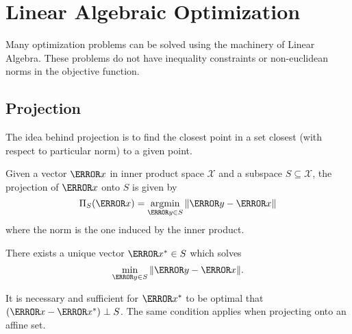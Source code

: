 \section{Linear Algebraic Optimization}
Many optimization problems can be solved using the machinery of Linear Algebra.
These problems do not have inequality constraints or non-euclidean norms in the objective function.
\subsection{Projection}
The idea behind projection is to find the closest point in a set closest (with respect to particular norm) to a given point.
\begin{definition}
  Given a vector $\V{x}$ in inner product space $\mathcal{X}$ and a subspace $S\subseteq\mathcal{X}$, the projection of $\V{x}$ onto $S$ is given by
  \[
	\Pi_S(\V{x}) = \argmin_{\V{y}\in S}\norm{\V{y}-\V{x}}
  \]
  where the norm is the one induced by the inner product.
  \label{defn:projection}
\end{definition}
\begin{theorem}
  There exists a unique vector $\V{x}^*\in S$ which solves
  \[
	\min_{\V{y}\in S} \norm{\V{y}-\V{x}}.
  \]
  \label{thm:projection}
\end{theorem} It is necessary and sufficient for $\V{x}^*$ to be optimal that $(\V{x}-\V{x}^*)\perp S$.
The same condition applies when projecting onto an affine set.
